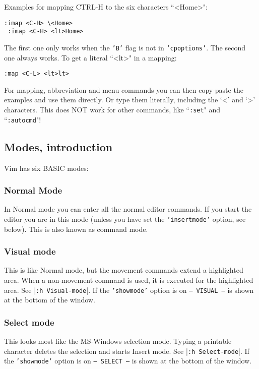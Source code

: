 Examples for mapping CTRL-H to the six characters ``<Home>":
\begin{Verbatim}[samepage=true]
 :imap <C-H> \<Home>
 :imap <C-H> <lt>Home>
\end{Verbatim}
The first one only works when the \texttt{'B'} flag is not in \texttt{'cpoptions'}.
The second one always works.
To get a literal ``<lt>" in a mapping:
\begin{Verbatim}[samepage=true]
 :map <C-L> <lt>lt>
\end{Verbatim}

For mapping, abbreviation and menu commands you can then copy-paste the examples and use them directly.
Or type them literally, including the `<' and `>' characters.
This does NOT work for other commands, like ``\texttt{:set}" and ``\texttt{:autocmd}"!

\subsection{Modes, introduction}
\label{vim-modes-intro}
\label{vim-modes}
Vim has six BASIC modes:

\subsubsection{Normal Mode}
\label{Normal}
\label{Normal-mode}
\label{command-mode}
In Normal mode you can enter all the normal editor commands.
If you start the editor you are in this mode (unless you have set the \texttt{'insertmode'} option, see below).
This is also known as command mode.

\subsubsection{Visual mode}
This is like Normal mode, but the movement commands extend a highlighted area.
When a non-movement command is used, it is executed for the highlighted area.
See |\texttt{:h Visual-mode}|.
If the \texttt{'showmode'} option is on \texttt{-- VISUAL --} is shown
at the bottom of the window.

\subsubsection{Select mode}
This looks most like the MS-Windows selection mode.
Typing a printable character deletes the selection and starts Insert mode.
See |\texttt{:h Select-mode}|.
If the \texttt{'showmode'} option is on \texttt{-- SELECT --} is shown at the bottom of the window.

